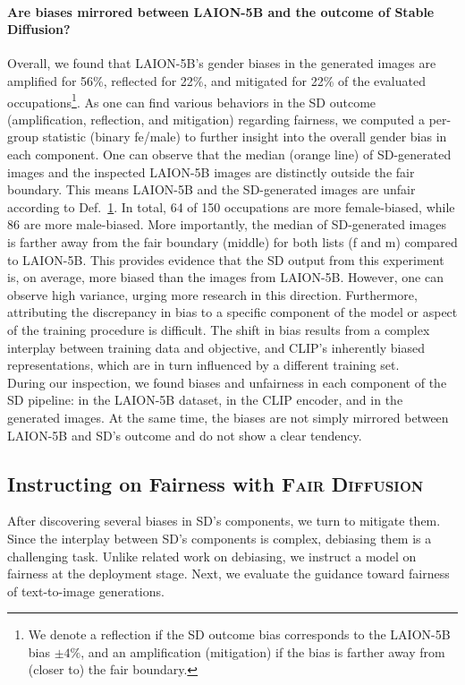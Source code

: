 \documentclass{article}%
\begin{document}
\paragraph{Are biases mirrored between LAION-5B and the outcome of Stable Diffusion?}
Overall, we found that LAION-5B's gender biases in the generated images are amplified for 56\%, reflected for 22\%, and mitigated for 22\% of the evaluated occupations\footnote{We denote a reflection if the SD outcome bias corresponds to the LAION-5B bias $\pm4\%$, and an amplification (mitigation) if the bias is farther away from (closer to) the fair boundary.}.
As one can find various behaviors in the SD outcome (amplification, reflection, and mitigation) regarding fairness, we computed a per-group statistic (binary fe/male) to further insight into the overall gender bias in each component. One can observe that the median (orange line) of SD-generated images and the inspected LAION-5B images are distinctly outside the fair boundary. This means LAION-5B and the SD-generated images are unfair according to Def.~\hyperref[def:fair1]{1}. In total, 64 of 150 occupations are more female-biased, while 86 are more male-biased.
More importantly, the median of SD-generated images is farther away from the fair boundary (middle) for both lists (f and m) compared to LAION-5B. 
This provides evidence that the SD output from this experiment is, on average, more biased than the images from LAION-5B. However, one can observe high variance, urging more research in this direction.
Furthermore, attributing the discrepancy in bias to a specific component of the model or aspect of the training procedure is difficult. The shift in bias results from a complex interplay between training data and objective, and CLIP's inherently biased representations, which are in turn influenced by a different training set. \\

\noindent
During our inspection, we found biases and unfairness in each component of the SD pipeline: in the LAION-5B dataset, in the CLIP encoder, and in the generated images. At the same time, the biases are not simply mirrored between LAION-5B and SD's outcome and do not show a clear tendency.

\subsection*{Instructing on Fairness with \textsc{Fair Diffusion}}
After discovering several biases in SD's components, we turn to mitigate them. Since the interplay between SD's components is complex, debiasing them is a challenging task. Unlike related work on debiasing, we instruct a model on fairness at the deployment stage. 
Next, we evaluate the guidance toward fairness of text-to-image generations. 
\end{document}
